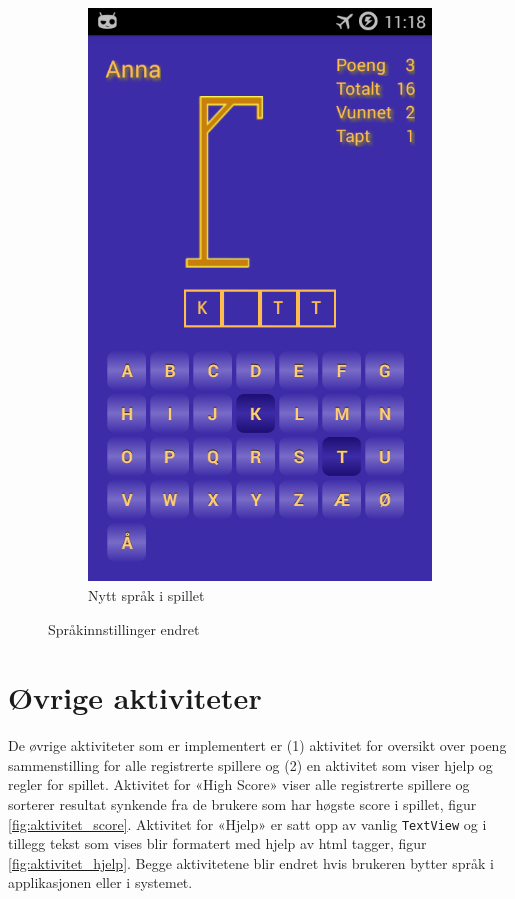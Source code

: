 \begin{figure}[ht]
\begin{subfigure}[b]{0.3\textwidth}
        \includegraphics[width=\textwidth]{./img/bruksanvisning/11.png}
        \caption{Nytt språk i spillet}
        \label{fig:spill_norsk}
    \end{subfigure}
    \caption{Språkinnstillinger endret}\label{fig:innstillinger_endret_norsk}
\end{figure}



\section{Øvrige aktiviteter}
De øvrige aktiviteter som er implementert er (1) aktivitet for oversikt over poeng sammenstilling for alle registrerte spillere og (2) en aktivitet som viser hjelp og regler for spillet. Aktivitet for «High Score» viser alle registrerte spillere og sorterer resultat synkende fra de brukere som har høgste score i spillet, figur \ref{fig:aktivitet_score}. Aktivitet for «Hjelp» er satt opp av vanlig \texttt{TextView} og i tillegg tekst som vises blir formatert med hjelp av html tagger, figur \ref{fig:aktivitet_hjelp}. Begge aktivitetene blir endret hvis brukeren bytter språk i applikasjonen eller i systemet. 

